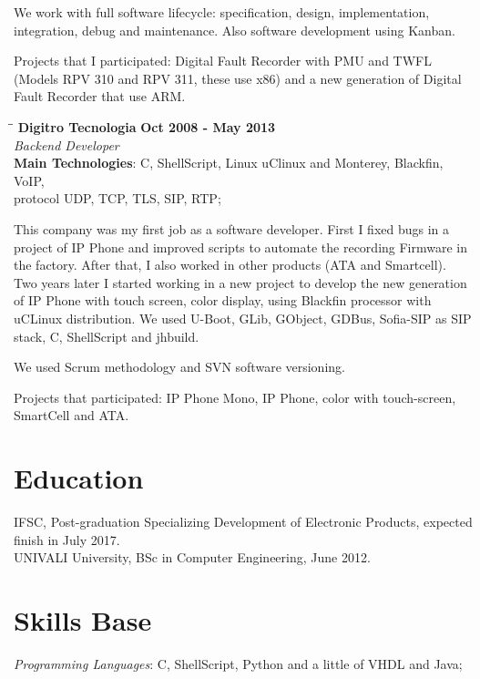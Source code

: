 \documentclass[margin]{res}
\begin{document}
\begin{resume}
We work with full software lifecycle: specification, design, implementation, integration, debug and maintenance. Also software development using Kanban.

Projects that I participated: Digital Fault Recorder with PMU and TWFL (Models RPV 310 and RPV 311, these use x86) and a new generation of Digital Fault Recorder that use ARM.

\vspace{-0.1in}
    \begin{tabbing}
    \hspace{2.3in}\= \hspace{1.7in}\= \kill
    \textbf{Digitro Tecnologia}    \>\>\textbf{Oct 2008 - May 2013}\\
    \textit{Backend Developer}\\
    \textbf{Main Technologies}: C, ShellScript, Linux uClinux and Monterey, Blackfin, VoIP,\\ protocol UDP, TCP, TLS, SIP, RTP;
    \end{tabbing}\vspace{-20pt}
    \vspace{2mm}
This company was my first job as a software developer. First I fixed bugs in a project of IP Phone and improved scripts to automate the recording Firmware in the factory. After that, I also worked in other products (ATA and Smartcell). Two years later I started working in a new project to develop the new generation of IP Phone with touch screen, color display, using Blackfin processor with uCLinux distribution. We used U-Boot, GLib, GObject, GDBus, Sofia-SIP as SIP stack, C, ShellScript and jhbuild.

We used Scrum methodology and SVN software versioning.

Projects that participated: IP Phone Mono, IP Phone, color with touch-screen, SmartCell and ATA. 

\section{Education}
 IFSC, Post-graduation Specializing Development of Electronic Products, expected finish in July 2017.\\
 UNIVALI University, BSc in Computer Engineering, June 2012.

\section{Skills Base} \textit{Programming Languages}: C, ShellScript, Python and a little of VHDL and Java;


\end{resume}
\end{document}
